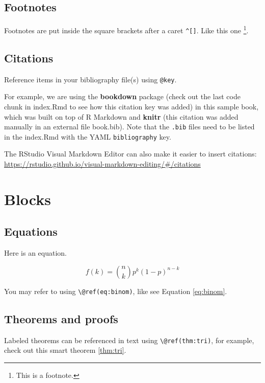 \documentclass[
]{book}
\theoremstyle{definition}
\theoremstyle{definition}
\theoremstyle{definition}
\theoremstyle{definition}
\theoremstyle{remark}
\begin{document}
\section{Footnotes}\label{footnotes}

Footnotes are put inside the square brackets after a caret \texttt{\^{}{[}{]}}. Like this one \footnote{This is a footnote.}.

\section{Citations}\label{citations}

Reference items in your bibliography file(s) using \texttt{@key}.

For example, we are using the \textbf{bookdown} package \citep{R-bookdown} (check out the last code chunk in index.Rmd to see how this citation key was added) in this sample book, which was built on top of R Markdown and \textbf{knitr} \citep{xie2015} (this citation was added manually in an external file book.bib).
Note that the \texttt{.bib} files need to be listed in the index.Rmd with the YAML \texttt{bibliography} key.

The RStudio Visual Markdown Editor can also make it easier to insert citations: \url{https://rstudio.github.io/visual-markdown-editing/\#/citations}

\chapter{Blocks}\label{blocks}

\section{Equations}\label{equations}

Here is an equation.

\begin{equation} 
  f\left(k\right) = \binom{n}{k} p^k\left(1-p\right)^{n-k}
  \label{eq:binom}
\end{equation}

You may refer to using \texttt{\textbackslash{}@ref(eq:binom)}, like see Equation \eqref{eq:binom}.

\section{Theorems and proofs}\label{theorems-and-proofs}

Labeled theorems can be referenced in text using \texttt{\textbackslash{}@ref(thm:tri)}, for example, check out this smart theorem \ref{thm:tri}.
\end{document}
